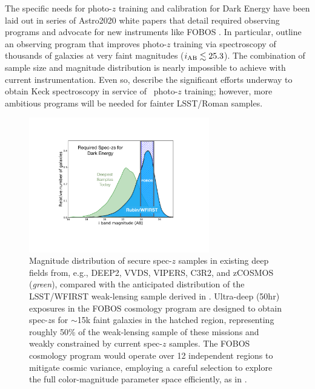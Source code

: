 \documentclass[11pt,a4paper,twoside,onecolumn,openany,final,oldfontcommands]{memoir}
\begin{document}
The specific needs for photo-$z$ training and calibration for Dark Energy have been laid out in series of Astro2020 white papers that detail required observing programs and advocate for new instruments like FOBOS \citep{newman19, hlovek19, mandelbaum19}.  In particular, \citet{newman15, newman19} outline an observing program that improves photo-$z$ training via spectroscopy of thousands of galaxies at very faint magnitudes ($i_{\rm AB} \lesssim 25.3$).  The combination of sample size and magnitude distribution is nearly impossible to achieve with current instrumentation.  Even so, \citet{masters19} describe the significant efforts underway to obtain Keck spectroscopy in service of \euclid\ photo-$z$ training; however, more ambitious programs will be needed for fainter LSST/Roman samples.



\begin{figure}
\begin{center}
\includegraphics[width=0.7\textwidth]{figs/fobos_cosmology_v2.pdf}
\end{center}
\caption[Magnitude distribution of spec-$z$ samples]{Magnitude distribution of secure spec-$z$ samples in existing deep fields from, e.g., DEEP2, VVDS, VIPERS, C3R2, and zCOSMOS (\textit{green}), compared with the anticipated distribution of the LSST/WFIRST weak-lensing sample derived in \citet[][\textit{blue}]{hemmati18}. Ultra-deep (50hr) exposures in the FOBOS cosmology program are designed to obtain spec-$z$s for $\sim$15k faint galaxies in the hatched region, representing roughly 50\% of the weak-lensing sample of these missions and weakly constrained by current spec-$z$ samples. The FOBOS cosmology program would operate over 12 independent regions to mitigate cosmic variance, employing a careful selection to explore the full color-magnitude parameter space efficiently, as in \cite{masters15}. }
\label{fig:cosmos_magdist}
\end{figure}
\end{document}
